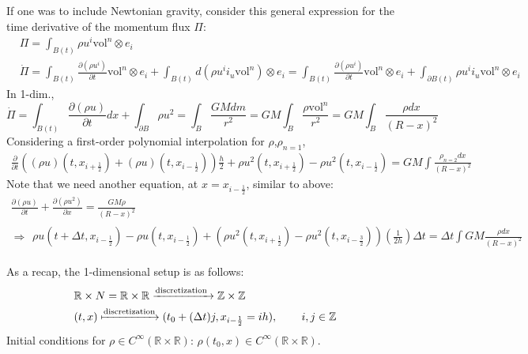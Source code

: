 \documentclass[10pt]{amsart}
\begin{document}
\begin{multicols*}{2}
If one was to include Newtonian gravity, consider this general expression for the time derivative of the momentum flux $\Pi$:
\begin{equation}
\begin{aligned}
  & \Pi = \int_{B(t)} \rho u^i \text{vol}^n \otimes e_i \\ 
  & \dot{\Pi} = \int_{B(t)} \frac{ \partial (\rho u^i ) }{ \partial t} \text{vol}^n \otimes e_i + \int_{B(t)} d(\rho u^i i_u \text{vol}^n ) \otimes e_i = \int_{B(t)} \frac{ \partial (\rho u^i )}{ \partial t} \text{vol}^n \otimes e_i + \int_{\partial B(t)} \rho u^i i_u \text{vol}^n \otimes e_i
\end{aligned}
  \end{equation}
In 1-dim.,
\[
\dot{\Pi} = \int_{B(t)} \frac{ \partial (\rho u)}{\partial t } dx + \int_{\partial B} \rho u^2 = \int_B \frac{GM dm }{r^2} = GM \int_B \frac{ \rho \text{vol}^n }{r^2} = GM \int_B \frac{ \rho dx}{(R-x)^2}
\]
Considering a first-order polynomial interpolation for $\rho$,$\rho_{n=1}$,
\[
\begin{gathered}
  \frac{ \partial }{ \partial t} ((\rho u)(t,x_{i+\frac{1}{2} } ) + (\rho u)(t,x_{i-\frac{1}{2} }) )\frac{h}{2} + \rho u^2(t,x_{i+\frac{1}{2} }) - \rho u^2(t,x_{i-\frac{1}{2} }) = GM \int \frac{ \rho_{n=2} dx}{ (R-x)^2}
  \end{gathered}
\]
Note that we need another equation, at $x=x_{i-\frac{1}{2}}$, similar to above:
\[
\begin{gathered}
  \frac{ \partial (\rho u) }{ \partial t} + \frac{ \partial (\rho u^2) }{ \partial x} = \frac{GM\rho}{(R-x)^2 } \\ 
    \Longrightarrow \begin{gathered}
      \rho u(t+\Delta t,x_{i-\frac{1}{2} } ) - \rho u(t,x_{i-\frac{1}{2} } ) + (\rho u^2(t,x_{i + \frac{1}{2} } ) - \rho u^2(t,x_{i - \frac{3}{2} } ) ) \left( \frac{1}{2h } \right) \Delta t = \Delta t \int GM \frac{ \rho dx }{ (R-x)^2 }
      \end{gathered}
  \end{gathered}
\]

As a recap, the 1-dimensional setup is as follows:
\[
\begin{aligned}
  & \mathbb{R} \times N = \mathbb{R} \times \mathbb{R} \xrightarrow{ \text{discretization }} \mathbb{Z} \times \mathbb{Z} \\ 
  & (t,x) \xmapsto{ \text{discretization} } (t_0 + (\Delta t)j, x_{i-\frac{1}{2} } = ih), \qquad \, i,j \in \mathbb{Z}
  \end{aligned}
\]
Initial conditions for $\rho \in C^{\infty}(\mathbb{R}\times \mathbb{R})$: $\rho(t_0,x) \in C^{\infty}(\mathbb{R}\times \mathbb{R})$.


\end{multicols*}
\end{document}
